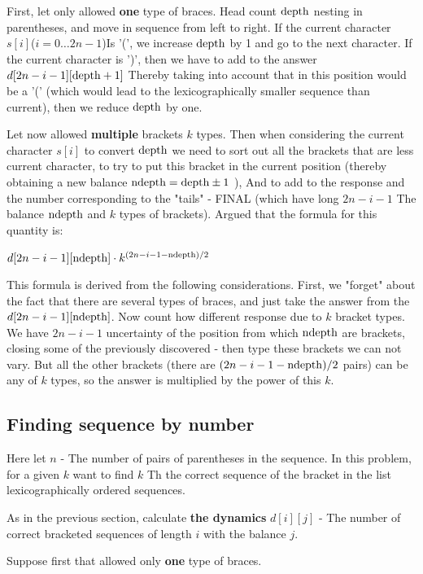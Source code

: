 First, let only allowed \textbf{one} type of braces. Head count $\rm depth$ nesting in parentheses, and move in sequence from left to right. If the current character $s [i]$($i = 0 \ldots 2n-1$)Is '(', we increase $\rm depth$ by 1 and go to the next character. If the current character is ')', then we have to add to the answer $d [2n-i-1][\rm depth +1]$ Thereby taking into account that in this position would be a '(' (which would lead to the lexicographically smaller sequence than current), then we reduce $\rm depth$ by one.

Let now allowed \textbf{multiple} brackets $k$ types. Then when considering the current character $s [i]$ to convert $\rm depth$ we need to sort out all the brackets that are less current character, to try to put this bracket in the current position (thereby obtaining a new balance $\rm ndepth = \rm depth \pm 1$ ), And to add to the response and the number corresponding to the "tails" - FINAL (which have long $2n-i-1$ The balance $\rm ndepth$ and $k$ types of brackets). Argued that the formula for this quantity is:

$d[2n-i-1][{\rm ndepth}]\cdot k^{(2n-i-1-{\rm ndepth})/2}$

This formula is derived from the following considerations. First, we "forget" about the fact that there are several types of braces, and just take the answer from the $d [2n-i-1][{\rm ndepth}]$. Now count how different response due to $k$ bracket types. We have $2n-i-1$ uncertainty of the position from which $\rm ndepth$ are brackets, closing some of the previously discovered - then type these brackets we can not vary. But all the other brackets (there are $(2n-i-1 - {\rm ndepth}) / 2$ pairs) can be any of $k$ types, so the answer is multiplied by the power of this $k$.

\subsection{ Finding sequence by number }

Here let $n$ - The number of pairs of parentheses in the sequence. In this problem, for a given $k$ want to find $k$ Th the correct sequence of the bracket in the list lexicographically ordered sequences.

As in the previous section, calculate \textbf{the dynamics} $d [i][j]$ - The number of correct bracketed sequences of length $i$ with the balance $j$.

Suppose first that allowed only \textbf{one} type of braces.

